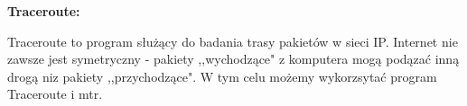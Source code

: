 \documentclass{article}
\begin{document}
\vspace{1\baselineskip}
\textbf{Traceroute: } \par
\vspace{1\baselineskip}
Traceroute to program służący do badania trasy pakietów w sieci IP. 
Internet nie zawsze jest symetryczny - pakiety ,,wychodzące" z komputera mogą podązać inną drogą niz pakiety ,,przychodzące". 
W tym celu możemy wykorzsytać program Traceroute i mtr.
\end{document}
